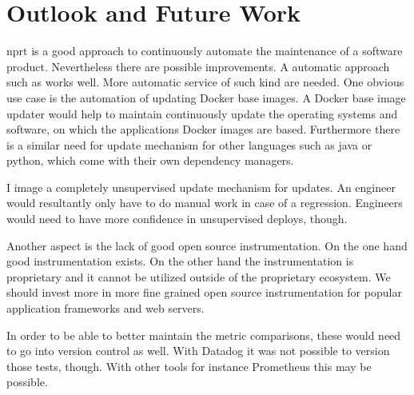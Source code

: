 \section{Outlook and Future Work}

\gls{nprt} is a good approach to continuously automate the maintenance of a software
product. Nevertheless there are possible improvements. A automatic approach such as
\gemupdater works well. More automatic service of such kind are needed. One obvious use
case is the automation of updating Docker base images. A Docker base image updater would
help to maintain continuously update the operating systems and software, on which the
applications Docker images are based. Furthermore there is a similar need for update
mechanism for other languages such as java or python, which come with their own dependency
managers.

I image a completely unsupervised update mechanism for updates. An engineer would
resultantly only have to do manual work in case of a regression. Engineers would need to
have more confidence in unsupervised deploys, though.

Another aspect is the lack of good open source instrumentation. On the one hand good
instrumentation exists. On the other hand the instrumentation is proprietary and it cannot
be utilized outside of the proprietary ecosystem. We should invest more in more fine
grained open source instrumentation for popular application frameworks and web servers.

In order to be able to better maintain the metric comparisons, these would need to go into
version control as well. With Datadog it was not possible to version those tests,
though. With other tools for instance Prometheus this may be possible.

